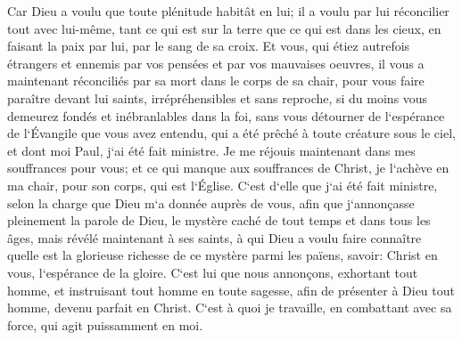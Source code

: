 \verse Car Dieu a voulu que toute plénitude habitât en lui; 
\verse il a voulu par lui réconcilier tout avec lui-même, tant ce qui est sur la terre que ce qui est dans les cieux, en faisant la paix par lui, par le sang de sa croix. 
\verse Et vous, qui étiez autrefois étrangers et ennemis par vos pensées et par vos mauvaises oeuvres, il vous a maintenant réconciliés par sa mort dans le corps de sa chair, 
\verse pour vous faire paraître devant lui saints, irrépréhensibles et sans reproche, 
\verse si du moins vous demeurez fondés et inébranlables dans la foi, sans vous détourner de l`espérance de l`Évangile que vous avez entendu, qui a été prêché à toute créature sous le ciel, et dont moi Paul, j`ai été fait ministre. 
\verse Je me réjouis maintenant dans mes souffrances pour vous; et ce qui manque aux souffrances de Christ, je l`achève en ma chair, pour son corps, qui est l`Église. 
\verse C`est d`elle que j`ai été fait ministre, selon la charge que Dieu m`a donnée auprès de vous, afin que j`annonçasse pleinement la parole de Dieu, 
\verse le mystère caché de tout temps et dans tous les âges, mais révélé maintenant à ses saints, 
\verse à qui Dieu a voulu faire connaître quelle est la glorieuse richesse de ce mystère parmi les païens, savoir: Christ en vous, l`espérance de la gloire. 
\verse C`est lui que nous annonçons, exhortant tout homme, et instruisant tout homme en toute sagesse, afin de présenter à Dieu tout homme, devenu parfait en Christ. 
\verse C`est à quoi je travaille, en combattant avec sa force, qui agit puissamment en moi. 

